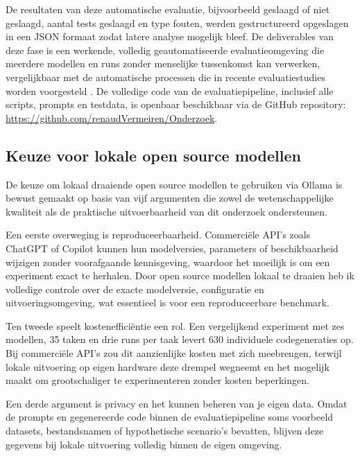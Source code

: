 De resultaten van deze automatische evaluatie, bijvoorbeeld geslaagd of niet geslaagd, aantal tests geslaagd en type fouten, werden gestructureerd opgeslagen in een JSON formaat zodat latere analyse mogelijk bleef. De deliverables van deze fase is een werkende, volledig geautomatiseerde evaluatieomgeving die meerdere modellen en runs zonder menselijke tussenkomst kan verwerken, vergelijkbaar met de automatische processen die in recente evaluatiestudies worden voorgesteld \autocite{Li2023,LopezEspejel2025}. De volledige code van de evaluatiepipeline, inclusief alle scripts, prompts en testdata, is openbaar beschikbaar via de GitHub repository: \url{https://github.com/renaudVermeiren/Onderzoek}.

\subsection{Keuze voor lokale open source modellen}

De keuze om lokaal draaiende open source modellen te gebruiken via Ollama is bewust gemaakt op basis van vijf argumenten die zowel de wetenschappelijke kwaliteit als de praktische uitvoerbaarheid van dit onderzoek ondersteunen.

Een eerste overweging is reproduceerbaarheid. Commerciële API's zoals ChatGPT of Copilot kunnen hun modelversies, parameters of beschikbaarheid wijzigen zonder voorafgaande kennisgeving, waardoor het moeilijk is om een experiment exact te herhalen. Door open source modellen lokaal te draaien heb ik volledige controle over de exacte modelversie, configuratie en uitvoeringsomgeving, wat essentieel is voor een reproduceerbare benchmark.

Ten tweede speelt kostenefficiëntie een rol. Een vergelijkend experiment met zes modellen, 35 taken en drie runs per taak levert 630 individuele codegeneraties op. Bij commerciële API's zou dit aanzienlijke kosten met zich meebrengen, terwijl lokale uitvoering op eigen hardware deze drempel wegneemt en het mogelijk maakt om grootschaliger te experimenteren zonder kosten beperkingen.

Een derde argument is privacy en het kunnen beheren van je eigen data. Omdat de prompts en gegenereerde code binnen de evaluatiepipeline soms voorbeeld datasets, bestandsnamen of hypothetische scenario's bevatten, blijven deze gegevens bij lokale uitvoering volledig binnen de eigen omgeving.

